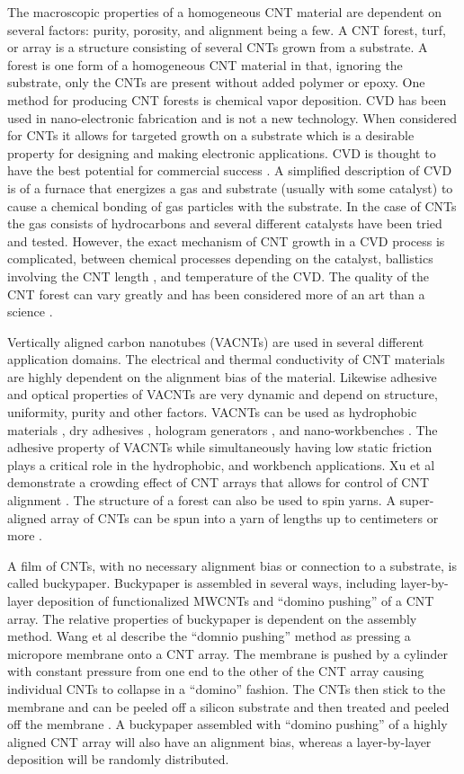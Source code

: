 	The macroscopic properties of a homogeneous CNT material are dependent on several factors: purity, porosity, and alignment being a few. A CNT forest, turf, or array is a structure consisting of several CNTs grown from a substrate. A forest is one form of a homogeneous CNT material in that, ignoring the substrate, only the CNTs are present without added polymer or epoxy. One method for producing CNT forests is chemical vapor deposition. CVD has been used in nano-electronic fabrication and is not a new technology. When considered for CNTs it allows for targeted growth on a substrate which is a desirable property for designing and making electronic applications. CVD is thought to have the best potential for commercial success \cite{Nessim2010}. A simplified description of CVD is of a furnace that energizes a gas and substrate (usually with some catalyst) to cause a chemical bonding of gas particles with the substrate. In the case of CNTs the gas consists of hydrocarbons and several different catalysts have been tried and tested. However, the exact mechanism of CNT growth in a CVD process is complicated, between chemical processes depending on the catalyst, ballistics involving the CNT length \cite{Louchev2003}, and temperature of the CVD. The quality of the CNT forest can vary greatly and has been considered more of an art than a science \cite{Nessim2010}.  
	
	Vertically aligned carbon nanotubes (VACNTs) are used in several different application domains. The electrical and thermal conductivity of CNT materials are highly dependent on the alignment bias of the material. Likewise adhesive and optical properties of VACNTs are very dynamic and depend on structure, uniformity, purity and other factors. VACNTs can be used as hydrophobic materials \cite{Lau2003}, dry adhesives \cite{Chen2012}, hologram generators \cite{Montelongo2013}, and nano-workbenches \cite{Gjerde2006}. The adhesive property of VACNTs while simultaneously having low static friction plays a critical role in the hydrophobic, and workbench applications. Xu et al demonstrate a crowding effect of CNT arrays that allows for control of CNT alignment \cite{Xu2012}. The structure of a forest can also be used to spin yarns. A super-aligned array of CNTs can be spun into a yarn of lengths up to centimeters or more \cite{Jiang2002}.
	
	A film of CNTs, with no necessary alignment bias or connection to a substrate, is called buckypaper. Buckypaper is assembled in several ways, including layer-by-layer deposition of functionalized MWCNTs \cite{Lee2008} and ``domino pushing'' of a CNT array. The relative properties of buckypaper is dependent on the assembly method. Wang et al describe the ``domnio pushing'' method as pressing a micropore membrane onto a CNT array. The membrane is pushed by a cylinder with constant pressure from one end to the other of the CNT array causing individual CNTs to collapse in a ``domino'' fashion. The CNTs then stick to the membrane and can be peeled off a silicon substrate and then treated and peeled off the membrane \cite{Wang2008}. A buckypaper assembled with ``domino pushing'' of a highly aligned CNT array will also have an alignment bias, whereas a layer-by-layer deposition will be randomly distributed.

